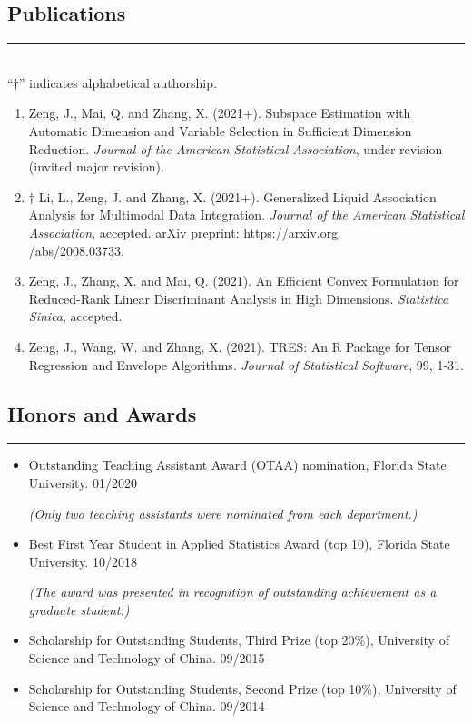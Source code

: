 \documentclass[10pt, oneside]{article}
\begin{document}
\subsection*{Publications}
\noindent\rule{\textwidth}{1pt}\\[1mm]
``$\dagger$'' indicates alphabetical authorship.
\begin{enumerate}[itemsep=0pt]
    \item Zeng, J., Mai, Q. and Zhang, X. (2021+). Subspace Estimation with Automatic Dimension and Variable Selection in Sufficient Dimension Reduction. \textit{Journal of the American Statistical Association}, under revision (invited major revision).
    \item $\dagger$ Li, L., Zeng, J. and Zhang, X. (2021+). Generalized Liquid Association Analysis for Multimodal Data Integration. \textit{Journal of the American Statistical Association}, accepted. arXiv preprint: https://arxiv.org\\/abs/2008.03733.
    \item Zeng, J., Zhang, X. and Mai, Q. (2021). An Efficient Convex Formulation for Reduced-Rank Linear Discriminant Analysis in High Dimensions. \textit{Statistica Sinica}, accepted.
    \item Zeng, J., Wang, W. and Zhang, X. (2021). TRES: An R Package for Tensor Regression and Envelope Algorithms. \textit{Journal of Statistical Software}, 99, 1-31.
\end{enumerate}

\subsection*{Honors and Awards}
\noindent\rule{\textwidth}{1pt}
\begin{itemize}[itemsep=-1pt]
    \item Outstanding Teaching Assistant Award (OTAA) nomination, Florida State University. \hfill 01/2020

    \vspace{-0.5mm}
    \textit{(Only two teaching assistants were nominated from each department.)}
    \item Best First Year Student in Applied Statistics Award (top 10), Florida State University. \hfill 10/2018

    \vspace{-0.5mm}
    \textit{(The award was presented in recognition of outstanding achievement as a graduate student.)}
    \item Scholarship for Outstanding Students, Third Prize (top 20\%), University of Science and Technology of China. \hfill 09/2015
    \item Scholarship for Outstanding Students, Second Prize (top 10\%), University of Science and Technology of China. \hfill 09/2014
\end{itemize}
\end{document}
